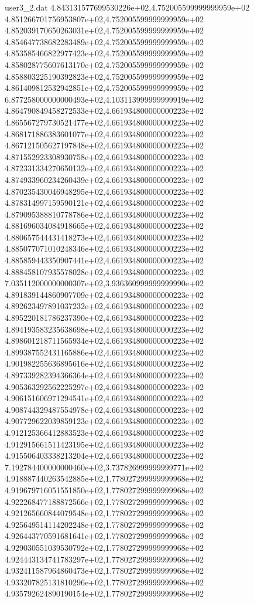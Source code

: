\begin{filecontents}{user3_2.dat}
4.843131577699530226e+02,4.752005599999999959e+02
4.851266701756953807e+02,4.752005599999999959e+02
4.852039170650263031e+02,4.752005599999999959e+02
4.854647738682283489e+02,4.752005599999999959e+02
4.853585466822977423e+02,4.752005599999999959e+02
4.858028775607613170e+02,4.752005599999999959e+02
4.858803225190392823e+02,4.752005599999999959e+02
4.861409812532942851e+02,4.752005599999999959e+02
6.877258000000000493e+02,4.103113999999999919e+02
4.864790849458272533e+02,4.661934800000000223e+02
4.865567279730521477e+02,4.661934800000000223e+02
4.868171886383601077e+02,4.661934800000000223e+02
4.867121505627197848e+02,4.661934800000000223e+02
4.871552923308930758e+02,4.661934800000000223e+02
4.872331334270650132e+02,4.661934800000000223e+02
4.874933960234260439e+02,4.661934800000000223e+02
4.870235430046948295e+02,4.661934800000000223e+02
4.878314997159590121e+02,4.661934800000000223e+02
4.879095388810778786e+02,4.661934800000000223e+02
4.881696034084918665e+02,4.661934800000000223e+02
4.880657544431418273e+02,4.661934800000000223e+02
4.885077071010248346e+02,4.661934800000000223e+02
4.885859443350907441e+02,4.661934800000000223e+02
4.888458107935578028e+02,4.661934800000000223e+02
7.035112000000000307e+02,3.936360999999999990e+02
4.891839144860907709e+02,4.661934800000000223e+02
4.892623497891037232e+02,4.661934800000000223e+02
4.895220181786237390e+02,4.661934800000000223e+02
4.894193583235638698e+02,4.661934800000000223e+02
4.898601218711565934e+02,4.661934800000000223e+02
4.899387552431165886e+02,4.661934800000000223e+02
4.901982255636895616e+02,4.661934800000000223e+02
4.897339282394366364e+02,4.661934800000000223e+02
4.905363292562225297e+02,4.661934800000000223e+02
4.906151606971294541e+02,4.661934800000000223e+02
4.908744329487554978e+02,4.661934800000000223e+02
4.907729622039859123e+02,4.661934800000000223e+02
4.912125366412883523e+02,4.661934800000000223e+02
4.912915661511423195e+02,4.661934800000000223e+02
4.915506403338213204e+02,4.661934800000000223e+02
7.192784400000000460e+02,3.737826999999999771e+02
4.918887440263542885e+02,1.778027299999999968e+02
4.919679716051551850e+02,1.778027299999999968e+02
4.922268477188872566e+02,1.778027299999999968e+02
4.921265660844079548e+02,1.778027299999999968e+02
4.925649514114202248e+02,1.778027299999999968e+02
4.926443770591681641e+02,1.778027299999999968e+02
4.929030551039530792e+02,1.778027299999999968e+02
4.924443134741783297e+02,1.778027299999999968e+02
4.932411587964860473e+02,1.778027299999999968e+02
4.933207825131810296e+02,1.778027299999999968e+02
4.935792624890190154e+02,1.778027299999999968e+02

\end{filecontents}
